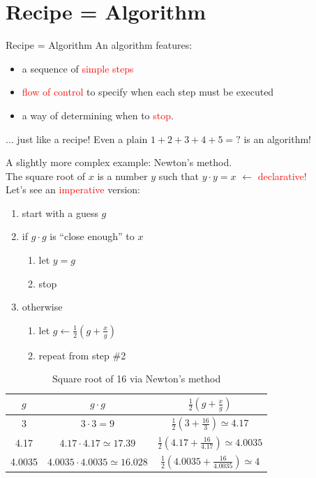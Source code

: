 \documentclass[t,handout,9pt]{beamer}
\begin{document}
\section{Recipe = Algorithm}
\begin{frame}{Recipe = Algorithm}
\vfill
An algorithm features:
\begin{itemize}
	\item a sequence of \textcolor{red}{simple steps}
	\item \textcolor{red}{flow of control} to specify when each step must be executed
	\item a way of determining when to \textcolor{red}{stop}.
\end{itemize}
\vfill
... just like a recipe!
\vfill
Even a plain $1+2+3+4+5=?$ is an algorithm!
\vfill
\end{frame}
%
\begin{frame}
A slightly more complex example: Newton's method.\\
The square root of $x$ is a number $y$ such that $y \cdot y = x$ $\leftarrow$ \textcolor{red}{declarative!}\\
Let's see an \textcolor{red}{imperative} version:
\begin{enumerate}
	\item start with a guess $g$
	\item if $g \cdot g$ is ``close enough'' to $x$\\
	\begin{enumerate}[a]
	\item let $y=g$
	\item stop
	\end{enumerate}
	\item otherwise\\
	\begin{enumerate}[a]
	\item let $g \leftarrow \frac{1}{2}\left( g + \frac{x}{g}\right)$
	\item repeat from step \#2
	\end{enumerate}
\end{enumerate}
\begin{table}[]
\centering
\caption{Square root of 16 via Newton's method}
\begin{tabular}{@{}ccc@{}}
\toprule
$g$    & $g \cdot g$                        & $\frac{1}{2}\left( g + \frac{x}{g}\right)$                      \\ \midrule
3      & $3 \cdot 3 =9$                     & $\frac{1}{2}\left( 3 + \frac{16}{3}\right) \simeq 4.17$         \\
4.17   & $4.17 \cdot 4.17\simeq 17.39$      & $\frac{1}{2}\left( 4.17 + \frac{16}{4.17}\right) \simeq 4.0035$ \\
4.0035 & $4.0035 \cdot 4.0035\simeq 16.028$ & $\frac{1}{2}\left( 4.0035 + \frac{16}{4.0035}\right) \simeq 4$  \\ \bottomrule
\end{tabular}
\end{table}
\end{frame}
%
\end{document}
